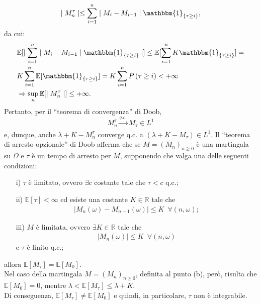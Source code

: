 \documentclass[11pt,largemargins]{homework}
\begin{document}
\begin{enumerate}
\begin{alphaparts}
    \begin{equation*}
    \mid M_{n}^{\tau}\mid \leq \sum_{i=1}^{n}\mid M_{i}-M_{i-1}\mid \mathbbm{1}_{\{\tau\geq i\}},
    \end{equation*}
    da cui:
    \begin{align*}
    &\mathbb{E}[\mid\sum_{i=1}^{n}\mid M_{i}-M_{i-1}\mid \mathbbm{1}_{\{\tau\geq i\}}\mid]\leq \mathbb{E}[\sum_{i=1}^{n}K\mathbbm{1}_{\{\tau\geq i\}}]=\\
    &K\sum_{i=1}^{n}\mathbb{E}[\mathbbm{1}_{\{\tau\geq i\}}]=K\sum_{i=1}^{n}P\left(\tau\geq i\right)<+\infty \\
 &\Rightarrow \sup_{n}{\mathbb{E}[\mid M_{n}^{\tau}\mid]}\leq +\infty.   
    \end{align*}
    Pertanto, per il ``teorema di convergenza'' di Doob,
    \begin{equation*}
    M_{n}^{\tau}\xrightarrow[]{q.c.} M_{\tau}\in L^{1}    
    \end{equation*}
    e, dunque, anche $\lambda +K-M_{n}^{\tau}$ converge q.c. a $\left(\lambda + K-M_{\tau}\right) \in L^{1}$.
    \questionpart
    Il ``teorema di arresto opzionale'' di Doob afferma che se $M=\left(M_{n}\right)_{n\geq 0}$ è una martingala su $\Omega$ e $\tau$ è un tempo di arresto per $M$, supponendo che valga una delle seguenti condizioni:
    \begin{itemize}
    \item[i)]
    $\tau$ è limitato, ovvero $\exists c$ costante tale che $\tau < c$ q.c.;
    \item[ii)]
    $\mathbb{E}[\tau]<\infty$ ed esiste una costante $K\in \mathbb{R}$ tale che
    \begin{align*}
    \mid M_{n}\left(\omega\right)-M_{n-1}\left(\omega\right)\mid \leq K \,\,\, \forall\left(n,\omega\right);
\end{align*}      
\item[iii)]
$M$ è limitata, ovvero $\exists K \in \mathbb{R}$ tale che
\begin{align*}
\mid M_{n}\left(\omega\right)\mid \leq K \,\,\, \forall\left(n,\omega\right)
\end{align*}
e $\tau$ è finito q.c.;
    \end{itemize}
    allora $\mathbb{E}[M_{\tau}]=\mathbb{E}[M_{0}]$.\\
    Nel caso della martingala $M=\left(M_{n}\right)_{n\geq 0}$, definita al punto (b), però, risulta che $\mathbb{E}[M_{0}]=0$, mentre $\lambda<\mathbb{E}[M_{\tau}]\leq \lambda + K$.\\
    Di conseguenza, $\mathbb{E}[M_{\tau}]\neq\mathbb{E}[M_{0}]$ e quindi, in particolare, $\tau$ non è integrabile. 
  \end{alphaparts}
  \end{enumerate}
  
\end{document}
